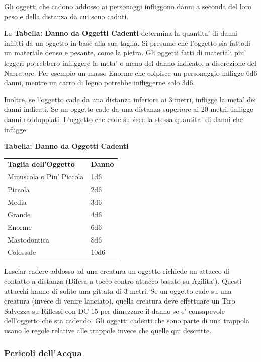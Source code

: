 \documentclass[a4paper,11pt,twoside,openany]{book}
\begin{document}
{		Gli oggetti che cadono addosso ai personaggi infliggono danni a seconda del loro peso e della distanza da cui sono caduti.
		
		La \textbf{Tabella: Danno da Oggetti Cadenti} determina la quantita' di danni inflitti da un oggetto in base alla sua taglia. Si presume che l'oggetto sia fattodi un materiale denso e pesante, come la pietra. 
		Gli oggetti fatti di materiali piu' leggeri potrebbero infliggere la meta' o meno del danno indicato, a discrezione del Narratore. Per esempio un masso Enorme che colpisce un personaggio infligge 6d6 danni, mentre un carro di legno potrebbe infliggerne solo 3d6.
		
		Inoltre, se l'oggetto cade da una distanza inferiore ai 3 metri, infligge la meta' dei danni indicati. Se un oggetto cade da una distanza superiore ai 20 metri, infligge danni raddoppiati. L'oggetto che cade subisce la stessa quantita' di danni che infligge.
		
		\bigskip
		
		\textbf{Tabella: Danno da Oggetti Cadenti}
		
		\begin{tabular}{ll}
			\toprule
			\textbf{Taglia dell'Oggetto} & \textbf{Danno}\tabularnewline
			Minuscola o Piu' Piccola & 1d6\tabularnewline
			Piccola & 2d6\tabularnewline
			Media & 3d6\tabularnewline
			Grande & 4d6\tabularnewline
			Enorme & 6d6\tabularnewline
			Mastodontica & 8d6\tabularnewline
			Colossale & 10d6\tabularnewline
			
		\end{tabular}
		
		\bigskip
		
		Lasciar cadere addosso ad una creatura un oggetto richiede un attacco di contatto a distanza (Difesa a tocco contro attacco basato su Agilita'). Questi attacchi hanno di solito una gittata di 3 metri. Se un oggetto cade su una creatura (invece di venire lanciato), quella creatura deve effettuare un Tiro Salvezza su Riflessi con DC 15 per dimezzare il danno se e' consapevole dell'oggetto che sta cadendo. Gli oggetti cadenti che sono parte di una trappola usano le regole relative alle trappole invece che quelle qui descritte.
		
		\subsubsection{Pericoli dell'Acqua}
		
		\label{pericoli-dellacqua}
		
}
\end{document}

